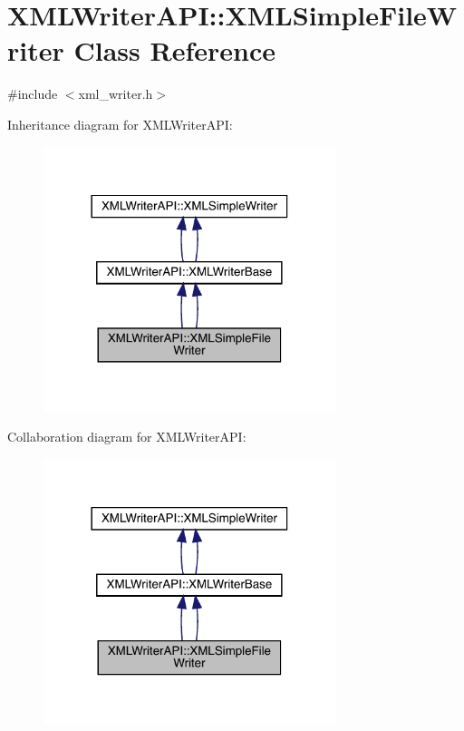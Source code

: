 \hypertarget{classXMLWriterAPI_1_1XMLSimpleFileWriter}{}\section{X\+M\+L\+Writer\+A\+PI\+:\+:X\+M\+L\+Simple\+File\+Writer Class Reference}
\label{classXMLWriterAPI_1_1XMLSimpleFileWriter}


{\ttfamily \#include $<$xml\+\_\+writer.\+h$>$}



Inheritance diagram for X\+M\+L\+Writer\+A\+PI\+:\nopagebreak
\begin{figure}[H]
\begin{center}
\leavevmode
\includegraphics[width=242pt]{d5/d57/classXMLWriterAPI_1_1XMLSimpleFileWriter__inherit__graph}
\end{center}
\end{figure}


Collaboration diagram for X\+M\+L\+Writer\+A\+PI\+:\nopagebreak
\begin{figure}[H]
\begin{center}
\leavevmode
\includegraphics[width=242pt]{dc/df8/classXMLWriterAPI_1_1XMLSimpleFileWriter__coll__graph}
\end{center}
\end{figure}
